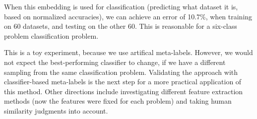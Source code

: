 \documentclass{llncs}
\begin{document}
When this embedding is used for classification (predicting what dataset it is, based on normalized accuracies), we can achieve an error of 10.7\%, when training on 60 datasets, and testing on the other 60. This is reasonable for a six-class problem classification problem. 

This is a toy experiment, because we use artifical meta-labels. However, we would not expect the best-performing classifier to change, if we have a different sampling from the same classification problem. Validating the approach with classifier-based meta-labels is the next step for a more practical application of this method. Other directions include investigating different feature extraction methods (now the features were fixed for each problem) and taking human similarity judgments into account.





\end{document}
